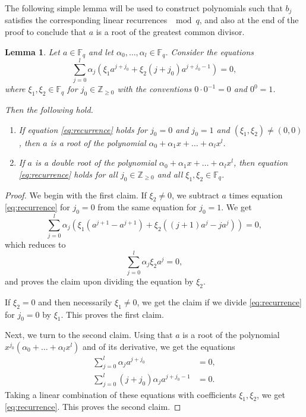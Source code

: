 \documentclass[12pt, notitlepage]{amsart}
\numberwithin{equation}{section}
\def\Z{\mathbb Z}
\def\F{\mathbb F}
\newtheorem{lemma}[theorem]{Lemma}
\theoremstyle{remark}
\theoremstyle{definition}
\theoremstyle{remark}
\numberwithin{equation}{section}
\renewcommand{\a}{\alpha}
\begin{document}
The following simple lemma will be used to construct polynomials such that
$b_j$ satisfies the corresponding linear recurrences $\mod q$, and also at the
end of the proof to conclude that $a$ is a root of the greatest common divisor.

\begin{lemma}\label{lm:recurrence}
Let $a\in\F_q$
and let $\a_0,\ldots,\a_l\in\F_q$.
Consider the equations
\begin{equation}\label{eq:recurrence}
\sum_{j=0}^{l}\a_j(\xi_1 a^{j+j_0}+\xi_2(j+j_0)a^{j+j_0-1} )=0,
\end{equation}
where $\xi_1,\xi_2\in\F_q$
for $j_0\in\Z_{\ge 0}$ with the conventions $0\cdot 0^{-1}=0$ and $0^0=1$.

Then the following hold.
\begin{enumerate}
	\item If equation \eqref{eq:recurrence} holds for $j_0=0$ and $j_0=1$ and
	$(\xi_1,\xi_2)\neq(0,0)$, then $a$ is a root of the polynomial $\a_0+\a_1 x+\ldots +\a_l x^l$.
	\item If $a$ is a double root of the polynomial $\a_0+\a_1 x+\ldots +\a_l x^l$, then
	equation \eqref{eq:recurrence} holds for all $j_0\in\Z_{\ge 0}$ and all $\xi_1,\xi_2\in \F_q$.
\end{enumerate}
\end{lemma}



\begin{proof}
We begin with the first claim.
If $\xi_2\neq 0$, we subtract $a$ times equation \eqref{eq:recurrence} for
$j_0=0$ from the same equation for $j_0=1$.
We get
\[
\sum_{j=0}^l\a_j(\xi_1(a^{j+1}-a^{j+1})+\xi_2((j+1)a^j-ja^j))=0,
\]
which reduces to
\[
\sum_{j=0}^l\a_j\xi_2a^j=0,
\]
and proves the claim upon dividing the equation by $\xi_2$.

If $\xi_2=0$ and then necessarily $\xi_1\neq 0$, we get the claim if we divide
\eqref{eq:recurrence} for $j_0=0$ by $\xi_1$.
This proves the first claim. 

Next, we turn to the second claim.
Using that $a$ is a root of the polynomial $x^{j_0}(\a_0+\ldots+\a_lx^l)$ and of its derivative,
we get the equations
\begin{align*}
\sum_{j=0}^l\a_j a^{j+j_0}&=0,\\
\sum_{j=0}^l(j+j_0)\a_j a^{j+j_0-1}&=0.
\end{align*}
Taking a linear combination of these equations with coefficients
$\xi_1, \xi_2$, we get \eqref{eq:recurrence}.
This proves the second claim.
\end{proof}
\end{document}
